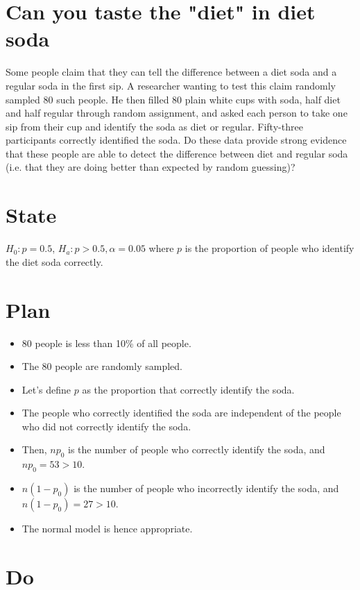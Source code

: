 \documentclass{scrreprt} %
\begin{document}
\section{Can you taste the "diet" in diet soda}

Some people claim that they can tell the difference between a diet soda and a regular soda in the
first sip. A researcher wanting to test this claim randomly sampled 80 such people. He then filled
80 plain white cups with soda, half diet and half regular through random assignment, and asked
each person to take one sip from their cup and identify the soda as diet or regular. Fifty-three
participants correctly identified the soda. Do these data provide strong evidence that these people
are able to detect the difference between diet and regular soda (i.e. that they are doing better
than expected by random guessing)?

\section{State}

$H_0: p = 0.5$, $H_a: p > 0.5, \alpha = 0.05$
where $p$ is the proportion of people who identify the diet soda correctly.

\section{Plan}

\begin{itemize}
	\item 80 people is less than 10\% of all people.
	\item The 80 people are randomly sampled.
	\item Let's define $p$ as the proportion that correctly identify the soda.
	\item The people who correctly identified the soda are independent of
	the people who did not correctly identify the soda.
	\item Then, $np_0$ is the number of people who correctly identify
	the soda, and $np_0 = 53 > 10$.
	\item $n(1-p_0)$ is the number of people who incorrectly identify the
	soda, and $n(1-p_0)= 27 > 10$.
	\item The normal model is hence appropriate.
\end{itemize}

\section{Do}
\end{document}
